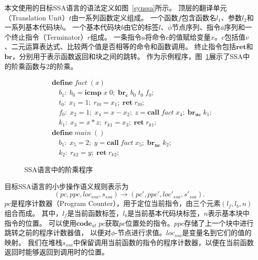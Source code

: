 本文使用的目标SSA语言的语法定义如图~\ref{synssa}所示。
顶层的翻译单元（Translation Unit）$t$由一系列函数定义组成。
一个函数$f$包含函数名$l_1$、参数$l_2$和一系列基本代码块$\overline{b}$。
一个基本代码块$b$由它的标签$l$、$\overline{\phi}$节点序列、指令$\overline{a}$序列和一个终止指令（Terminator）$r$组成。
一条指令$a$将命令$c$的值赋给变量$x$。$c$包括值$v$、二元运算表达式、比较两个值是否相等的命令和函数调用。
终止指令包括$\mathbf{ret}$和$\mathbf{br}$，分别用于表示函数返回和块之间的跳转。
作为示例程序，图~\ref{factssa}展示了SSA中的阶乘函数与2的阶乘。

\begin{figure}[ht]
    \centering
    \begin{equation}
        \nonumber
        \begin{aligned}
            & \mathbf{define}\; fact\; (x)\\
            & \quad b_1:\; b_0 = \mathbf{icmp}\; x\; 0;\; \mathbf{br_c}\; b_0\; t_0\; f_0; \\
            & \quad t_0:\; x_1 = 1;\; r_{t0} = x_1;\; \mathbf{ret}\; r_{t0}; \\
            & \quad f_0:\; x_2 = 1;\; x_4 = x - x_2;\; z = \mathbf{call}\; fact\; x_4;\; \mathbf{br_{uc}}\; k_1; \\
            & \quad k_1:\; x_3 = x*z;\; r_{k1} = x_3;\; \mathbf{ret}\; r_{k1}; \\
            & \mathbf{define}\; main\; ( )\\
            & \quad b_1:\; x_5 = 2;\; y = \mathbf{call}\; fact\; x_5;\; \mathbf{br_{uc}}\; k_2;\\
            & \quad k_2:\; r_{k2} = y;\; \mathbf{ret}\; r_{k2};
        \end{aligned}
    \end{equation}
    \caption{SSA语言中的阶乘程序}\label{factssa}
\end{figure}

目标SSA语言的小步操作语义规则表示为
\begin{equation}
(pc, ppc, loc_{ssa}, s_{ssa}) \rightarrow (pc', ppc', loc'_{ssa}, s'_{ssa}).
\end{equation}
$pc$是程序计数器（Program Counter），用于定位当前指令，由三个元素$(l_{f}, l_b, n)$组合而成。
其中，$l_{f}$是当前函数标签，$l_b$是当前基本代码块标签，$n$表示基本块中指令的位置。
可以使用$\mathbf{code}_{at}\; pc$获取$pc$位置处的指令。$ppc$存储了上一个块中进行跳转之前的程序计数器值，
以便对$\phi$-节点进行求值。$loc_{ssa}$是变量名到它们的值的映射。
我们在堆栈$s_{ssa}$中保留调用当前函数的指令的程序计数器，以便在当前函数返回时能够返回到调用时的位置。

